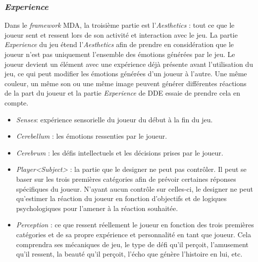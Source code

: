 \subsubsection*{\emph{Experience}}
    Dans le \emph{framework} MDA, la troisième partie est l'\emph{Aesthetics} : tout ce que le joueur sent et ressent lors de son activité et interaction avec le jeu. 
    La partie \emph{Experience} du jeu étend l'\emph{Aesthetics} afin de prendre en considération que le joueur n'est pas uniquement l'ensemble des émotions générées par le jeu. 
    Le joueur devient un élément avec une expérience déjà présente avant l'utilisation du jeu, ce qui peut modifier les émotions générées d'un joueur à l'autre. Une même couleur, un même son ou une même image peuvent générer différentes réactions de la part du joueur et la partie \emph{Experience} de DDE essaie de prendre cela en compte.
    \begin{itemize}
        \item \emph{Senses}: expérience sensorielle du joueur du début à la fin du jeu.
        \item \emph{Cerebellum} : les émotions ressenties par le joueur.
        \item \emph{Cerebrum} : les d\'efis intellectuels et les décisions prises par le joueur.
        \item \emph{Player<Subject>} : la partie que le designer ne peut pas contrôler. Il peut se baser sur les trois premières catégories afin de prévoir certaines réponses spécifiques du joueur. N'ayant aucun contrôle sur celles-ci, le designer ne peut qu'estimer la réaction du joueur en fonction d'objectifs et de logiques psychologiques pour l'amener à la réaction souhaitée.
        \item \emph{Perception} : ce que ressent réellement le joueur en fonction des trois premières catégories et de sa propre expérience et personnalité en tant que joueur. Cela comprendra ses mécaniques de jeu, le type de d\'efi qu'il perçoit, l'amusement qu'il ressent, la beauté qu'il perçoit, l'écho que génère l'histoire en lui, etc.
    \end{itemize}


